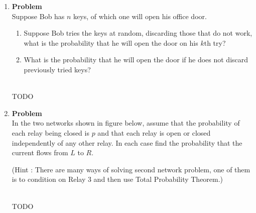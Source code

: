 \documentclass[12pt]{article}
\newenvironment{Ex}{\textbf{Problem}\vspace{.75em}\\}{}
\begin{document}
\begin{enumerate}
\begin{Ex}
      This problem is aimed to help you refine your basic
      understanding of independence.
      \begin{enumerate}
      \item Suppose that an event $E$ is independent of itself. Show
        that either $P(E) = 0$ or $P(E) = 1$.
      \item Events $A$ and $B$ have probabilities $P(A)=0.3$ and
        $P(B)=0.4$. What is $P(A \cup B)$ if $A$ and $B$ are
        independent? What is $P(A \cup B)$ if $A$ and $B$ are
        mutually exclusive?
      \item Now suppose that $P(A) = 0.6$ and $P(B) = 0.8$. In this
        case, could the events $A$ and $B$ be independent? Could they
        be mutually exclusive?
      \item If $A$ and $B$ are independent, show that $A^c$ and $B$
        are also independent.
      \end{enumerate}
      \begin{solution} \hfill \\
        {\huge TODO}
      \end{solution}
    \end{Ex}
  \item
    \begin{Ex}
      Suppose Bob has $n$ keys, of which one will open his office
      door.
      \begin{enumerate}
      \item Suppose Bob tries the keys at random, discarding those
        that do not work, what is the probability that he will open
        the door on his $k\text{th}$ try?
      \item What is the probability that he will open the door if he
        does not discard previously tried keys?
      \end{enumerate}
      \begin{solution} \hfill \\
        {\huge TODO}
      \end{solution}
    \end{Ex}
  \item
    \begin{Ex}
      In the two networks shown in figure below, assume that the
      probability of each relay being closed is $p$ and that each
      relay is open or closed independently of any other relay. In
      each case find the probability that the current flows from $L$
      to $R$.

      (Hint : There are many ways of solving second network problem,
      one of them is to condition on Relay 3 and then use Total
      Probability Theorem.)
      \begin{solution} \hfill \\
        {\huge TODO}
      \end{solution}
    \end{Ex}
\end{enumerate}
\end{document}
